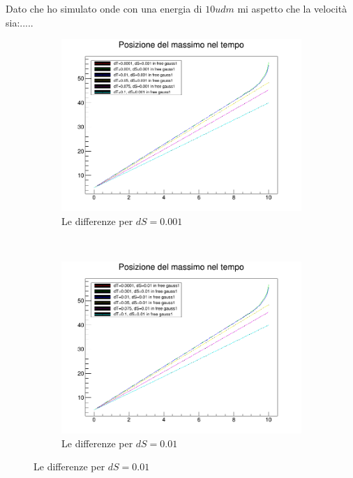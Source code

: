 Dato che ho simulato onde con una energia di $10 udm$ mi aspetto che la velocit\`a sia:.....%

\begin{figure}\label{fig:velocita}
	\centering
\begin{subfigure}[b]{0.49\textwidth}
\includegraphics[width=\textwidth]{IMG/v_g1_0001}
\caption[Differenze in 0.001]{Le differenze per $dS = 0.001$}
\end{subfigure}
~
\begin{subfigure}[b]{0.49\textwidth}
\includegraphics[width=\textwidth]{IMG/v_g1_001}
\caption[Differenze in 0.01]{Le differenze per $dS = 0.01$}
\end{subfigure}


\end{figure}
